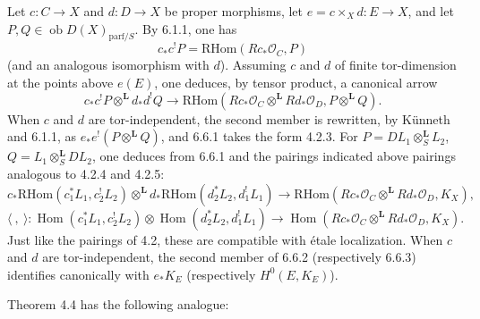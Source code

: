 \documentclass[11pt]{article}
\providecommand{\cO}{\mathcal{O}}
\DeclareMathOperator{\Hom}{Hom}
\providecommand{\RHom}{\mathrm{RHom}}
\providecommand{\RHom}{\mathrm{RHom}}
\providecommand{\Hom}{\operatorname{Hom}}
\providecommand{\RHom}{\mathrm R\mathcal{H}om}
\providecommand{\RHom}{\mathrm{RHom}}
\begin{document}
Let $c:C\to X$ and $d:D\to X$ be proper morphisms, let $e=c\times_Xd:E\to X$, and let $P,Q\in\operatorname{ob}D(X)_{\mathrm{parf}/S}$. By 6.1.1, one has
\[
c_*c^!P=\RHom(Rc_*\cO_C,P)
\]
(and an analogous isomorphism with $d$). Assuming $c$ and $d$ of finite tor-dimension at the points above $e(E)$, one deduces, by tensor product, a canonical arrow
\begin{equation}
\tag{6.6.1}
c_*c^!P\otimes^{\mathbf L}d_*d^!Q\longrightarrow
\RHom(Rc_*\cO_C\otimes^{\mathbf L}Rd_*\cO_D,P\otimes^{\mathbf L}Q).
\end{equation}
When $c$ and $d$ are tor-independent, the second member is rewritten, by Künneth and 6.1.1, as $e_*e^!(P\otimes^{\mathbf L}Q)$, and 6.6.1 takes the form 4.2.3. For $P=DL_1\otimes_S^{\mathbf L}L_2$, $Q=L_1\otimes_S^{\mathbf L}DL_2$, one deduces from 6.6.1 and the pairings indicated above pairings analogous to 4.2.4 and 4.2.5:
\begin{equation}
\tag{6.6.2}
c_*\RHom(c_1^*L_1,c_2^!L_2)\otimes^{\mathbf L}d_*\RHom(d_2^*L_2,d_1^!L_1)
\longrightarrow\RHom(Rc_*\cO_C\otimes^{\mathbf L}Rd_*\cO_D,K_X),
\end{equation}
\begin{equation}
\tag{6.6.3}
\langle\ ,\ \rangle:\Hom(c_1^*L_1,c_2^!L_2)\otimes\Hom(d_2^*L_2,d_1^!L_1)
\longrightarrow\Hom(Rc_*\cO_C\otimes^{\mathbf L}Rd_*\cO_D,K_X).
\end{equation}
Just like the pairings of 4.2, these are compatible with étale localization. When $c$ and $d$ are tor-independent, the second member of 6.6.2 (respectively 6.6.3) identifies canonically with $e_*K_E$ (respectively $H^0(E,K_E)$).

Theorem 4.4 has the following analogue:
\end{document}
